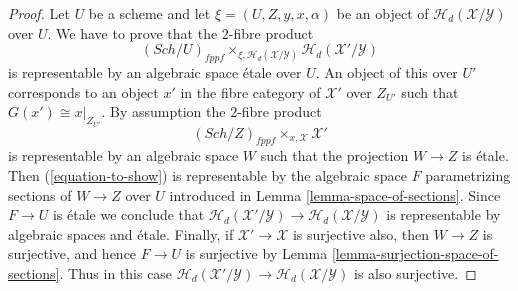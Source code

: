\documentclass{stacks-project}
\theoremstyle{plain}
\theoremstyle{definition}
\theoremstyle{remark}
\numberwithin{equation}{subsection}
\def\Sch{\mathit{Sch}}
\begin{document}
\begin{proof}
Let $U$ be a scheme and let $\xi = (U, Z, y, x, \alpha)$ be an object of
$\mathcal{H}_d(\mathcal{X}/\mathcal{Y})$ over $U$.
We have to prove that the $2$-fibre product
\begin{equation}
\label{equation-to-show}
(\Sch/U)_{fppf}
\times_{\xi, \mathcal{H}_d(\mathcal{X}/\mathcal{Y})}
\mathcal{H}_d(\mathcal{X}'/\mathcal{Y})
\end{equation}
is representable by an algebraic space \'etale over $U$.
An object of this over $U'$ corresponds to an object
$x'$ in the fibre category of $\mathcal{X}'$ over $Z_{U'}$
such that $G(x') \cong x|_{Z_{U'}}$.
By assumption the $2$-fibre product
$$
(\Sch/Z)_{fppf} \times_{x, \mathcal{X}} \mathcal{X}'
$$
is representable by an algebraic space $W$ such that the projection
$W \to Z$ is \'etale. Then (\ref{equation-to-show})
is representable by the algebraic space $F$ parametrizing sections of
$W \to Z$ over $U$ introduced in
Lemma \ref{lemma-space-of-sections}.
Since $F \to U$ is \'etale we conclude that
$\mathcal{H}_d(\mathcal{X}'/\mathcal{Y}) \to
\mathcal{H}_d(\mathcal{X}/\mathcal{Y})$ is representable by
algebraic spaces and \'etale.
Finally, if $\mathcal{X}' \to \mathcal{X}$ is surjective also,
then $W \to Z$ is surjective, and hence $F \to U$ is surjective by
Lemma \ref{lemma-surjection-space-of-sections}.
Thus in this case
$\mathcal{H}_d(\mathcal{X}'/\mathcal{Y}) \to
\mathcal{H}_d(\mathcal{X}/\mathcal{Y})$ is also surjective.
\end{proof}
\end{document}
